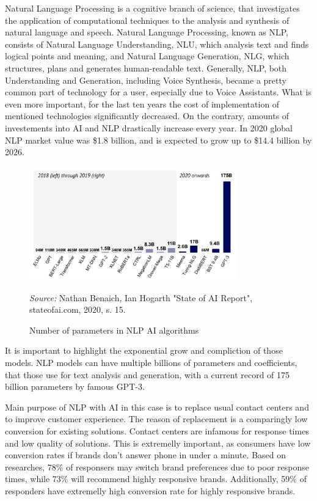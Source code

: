 Natural Language Processing is a cognitive branch of science, that investigates the application of computational techniques to the analysis and synthesis of natural language and speech.
Natural Language Processing, known as NLP, consists of Natural Language Understanding, NLU, which analysis text and finds logical points and meaning, and Natural Language Generation, NLG, which structures, plans and generates human-readable text.
Generally, NLP, both Understanding and Generation, including Voice Synthesis, became a pretty common part of technology for a user, especially due to Voice Assistants.
What is even more important, for the last ten years the cost of implementation of mentioned technologies significantly decreased.
On the contrary, amounts of investements into AI and NLP drastically increase every year.
In 2020 global NLP market value was \$1.8 billion, and is expected to grow up to \$14.4 billion by 2026.
\cite{pwc_ai_nlp}

\begin{figure}
    \centering
    \includegraphics[width=0.8\textwidth,keepaspectratio]{images/nlp_models_parameters.png}
    \caption{Number of parameters in NLP AI algorithms}
    \medskip
    \footnotesize\textit{Source:} Nathan Benaich, Ian Hogarth "State of AI Report", stateofai.com, 2020, s. 15.
\end{figure}

It is important to highlight the exponential grow and compliction of those models. 
NLP models can have multiple billions of parameters and coefficients, that those use for text analysis and generation, with a current record of 175 billion parameters by famous GPT-3.

Main purpose of NLP with AI in this case is to replace usual contact centers and to improve customer experience.
The reason of replacement is a comparingly low conversion for existing solutions.
Contact centers are infamous for response times and low quality of solutions.
This is extremelly important, as consumers have low conversion rates if brands don't answer phone in under a minute.
Based on researches, 78\% of responsers may switch brand preferences due to poor response times, while 73\% will recommend highly responsive brands.
Additionally, 59\% of responders have extremelly high conversion rate for highly responsive brands.
\cite{lfbyphone_consumer_analytics}


